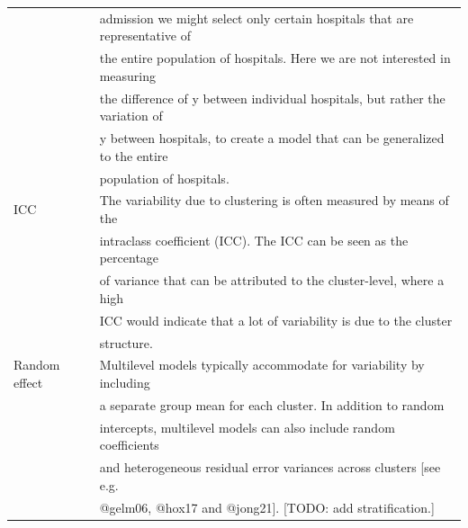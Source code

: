 \documentclass[
]{jss}
\begin{document}
\begin{table}[tb]
\begin{tabular}{ll}
& admission we might select only certain hospitals that are representative of \\                     & the entire population of hospitals. Here we are not interested in measuring \\ 
& the difference of y between individual hospitals, but rather the variation of\\                     & y between hospitals, to create a model that can be generalized to the entire\\                     & population of hospitals. \\                    

ICC                 & The variability due to clustering is often measured by means of the \\
                    & intraclass coefficient (ICC). The ICC can be seen as the percentage \\
                    & of variance that can be attributed to the cluster-level, where a high \\
                    & ICC would indicate that a lot of variability is due to the cluster \\
                    & structure. \\
Random effect       & Multilevel models typically accommodate for variability by including \\
                    & a separate group mean for each cluster. In addition to random \\
                    & intercepts, multilevel models can also include random coefficients \\
                    & and heterogeneous residual error variances across clusters [see e.g. \\
                    & @gelm06, @hox17 and @jong21]. [TODO: add stratification.] \\
\hline
\end{tabular}
\end{table}
\end{document}
